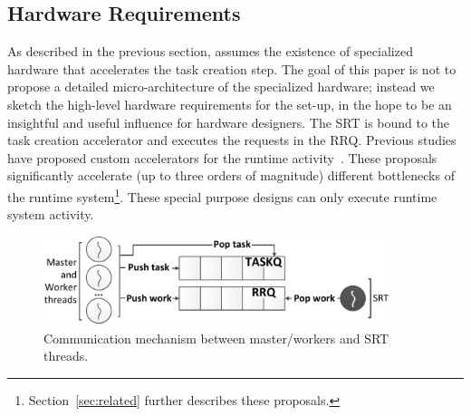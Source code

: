 \subsection{Hardware Requirements}
\label{sec:hw_req}

As described in the previous section, {\proposal} assumes the existence of specialized hardware that accelerates the task creation step. 
The goal of this paper is not to propose a detailed micro-architecture of the specialized hardware; instead we sketch the high-level hardware requirements for the {\proposal} set-up, in the hope to be an insightful and useful influence for hardware designers.
The SRT is bound to the task creation accelerator and executes the requests in the RRQ. 
Previous studies have proposed custom accelerators for the runtime activity~\cite{TaskSS, Xubin, Nexus, Swarm, TMU, Carbon}. 
These proposals significantly accelerate (up to three orders of magnitude) different bottlenecks of the runtime system\footnote{Section~\ref{sec:related} further describes these proposals.}. 
These special purpose designs can only execute runtime system activity.


\begin{figure}[t!]%
	\centering
	
	\includegraphics[width=0.9\textwidth]{figures/communication2.pdf}
	\caption{Communication mechanism between master/workers and SRT threads.}
	\label{fig:communication}
\end{figure}
	
